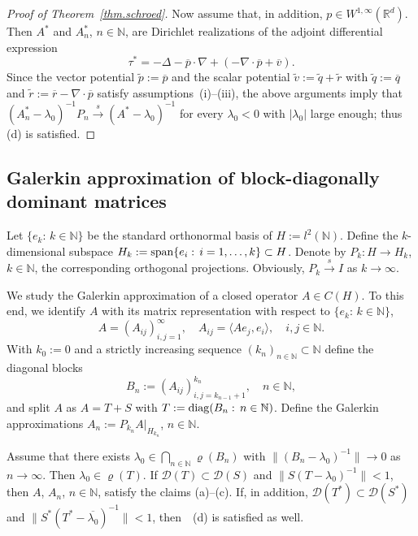 \documentclass[a4paper,reqno]{amsart}
\begin{document}
\begin{proof}[Proof of Theorem~{\rm\ref{thm.schroed}}]
Now assume that, in addition, $p\in W^{1,\infty}({\mathbb{R}}^d)$. Then $A^*$ and $A_n^*$, $n\in{\mathbb{N}}$, are Dirichlet realizations of the adjoint differential expression
$$\tau^*=-\Delta-\overline{p}\cdot\nabla+(-\nabla\cdot \overline{p}+\overline{v}).$$
Since the vector potential $\widetilde p:=\overline{p}$ and the scalar potential $\widetilde v:=\widetilde q+\widetilde r$ with $\widetilde q:=\overline{q}$ and $\widetilde r:=\overline{r}-\nabla\cdot\overline{p}$ satisfy assumptions~(i)--(iii), the above arguments imply that $(A_n^*-\lambda_0)^{-1}P_n{\stackrel{s}{\rightarrow}} (A^*-\lambda_0)^{-1}$ for every $\lambda_0<0$ with $|\lambda_0|$ large enough; thus (d) is satisfied.
\end{proof}

\subsection{Galerkin approximation of block-diagonally dominant matrices}

Let $\{e_k:\,k\in{\mathbb{N}}\}$ be the standard orthonormal basis of $H:=l^2({\mathbb{N}})$. Define
the $k$-dimensional subspace $H_k:={\rm span}\{e_i:\,i=1,\dots,k\}\subset H$.
Denote by $P_k:H\to H_k$, $k\in{\mathbb{N}}$, the corresponding orthogonal projections. Obviously, $P_k{\stackrel{s}{\rightarrow}} I$ as $k\to\infty$.

We study the Galerkin approximation of a closed operator $A\in C(H)$. To this end, we identify $A$ with its matrix representation with respect to $\{e_k:\,k\in{\mathbb{N}}\}$,
$$A=(A_{ij})_{i,j=1}^{\infty}, \quad A_{ij}=\langle A e_j,e_i\rangle, \quad i,j\in{\mathbb{N}}.$$
With $k_0:=0$ and a strictly increasing sequence $(k_n)_{n\in{\mathbb{N}}}\subset{\mathbb{N}}$ define the diagonal blocks
$$B_n:=(A_{ij})_{i,j=k_{n-1}+1}^{k_n}, \quad n\in{\mathbb{N}},$$
and split $A$ as $A=T+S$ with $T:={\rm diag}(B_n:\,n\in{\mathbb{N}})$.
Define the Galerkin approximations $A_n:=P_{k_n}A|_{H_{k_n}}$, $n\in{\mathbb{N}}$.

\begin{theorem}\label{thmgalerkin}
Assume that there exists $\lambda_0\in\underset{n\in{\mathbb{N}}}{\bigcap}\varrho(B_n)$ with
$\|(B_n-\lambda_0)^{-1}\|\to 0$ as $n\to\infty$. Then $\lambda_0\in\varrho(T)$.
If ${\mathcal D}(T)\subset{\mathcal D}(S)$ and $\|S(T-\lambda_0)^{-1}\|<1$,
then $A$, $A_n$, $n\in{\mathbb{N}}$, satisfy the claims  {\rm (a)--(c)}.
If, in addition,   ${\mathcal D}(T^*)\subset{\mathcal D}(S^*)$ and $\|S^*(T^*-\overline{\lambda_0})^{-1}\|<1$, then~{\rm~(d)} is satisfied as well.
\end{theorem}
\end{document}
